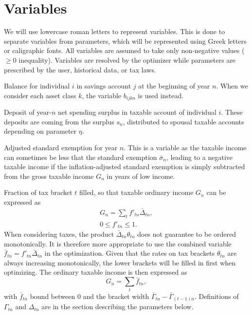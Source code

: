 \documentclass{report}[fleqn,11pt]
\begin{document}
\section{Variables}
We will use lowercase roman letters to represent variables. This is done to separate
variables from parameters, which will be represented using
Greek letters or caligraphic fonts. All variables are assumed
to take only non-negative values ($\ge 0$ inequality). Variables are resolved by the optimizer
while parameters are prescribed by the user, historical data, or tax laws.
\begin{description}[leftmargin=4em,style=multiline]
\item [$b_{ijn}$]
	Balance for individual $i$ in savings account $j$ at the beginning of year $n$.
	When we consider each asset class $k$, the variable $b_{ijkn}$ is used instead.
\item [$d_{in}$]
	Deposit of year-$n$ net spending surplus in taxable account of individual $i$.
	These deposits are coming from the surplus $s_n$, distributed to
	spousal taxable accounts depending on parameter $\eta$.
\item [$e_{n}$]
	Adjusted standard exemption for year $n$. This is a variable as the taxable income can
        sometimes be less that the standard exemption $\bar{\sigma}_n$, leading to a
	negative taxable income if the inflation-adjusted standard exemption is simply subtracted
	from the gross taxable income $G_n$ in years of low income.
\item [$f_{t n}$]
	Fraction of tax bracket $t$ filled, so that taxable ordinary income $G_n$ can be expressed as
	\begin{eqnarray}
		G_n = \sum_t f'_{t n}\bar{\Delta}_{t n},\\
		0 \leq f'_{t n} \leq 1.
	\end{eqnarray}
	When considering taxes,
	the product $\bar{\Delta}_{tn}\theta_{tn}$ does not guarantee to
	be ordered monotonically. It is therefore more appropriate to use the combined variable
	$\bar{f}_{tn} = f'_{tn}\bar{\Delta}_{tn}$ in the optimization. Given that the rates on
	tax brackets $\theta_{tn}$ are always increasing monotonically, the lower brackets
	will be filled in first when optimizing. The ordinary taxable income is then expressed as
	\begin{equation}
		\label{Eq:Tx1}
		G_n = \sum_t \bar{f}_{tn},
	\end{equation}
	with $\bar{f}_{tn}$ bound between 0 and the bracket width $\bar{\Gamma}_{tn} - \bar{\Gamma}_{(t-1)n}$. 
	Definitions of $\Gamma_{tn}$ and $\Delta_{tn}$ are in the section describing the parameters below. 


\end{description}
\end{document}
